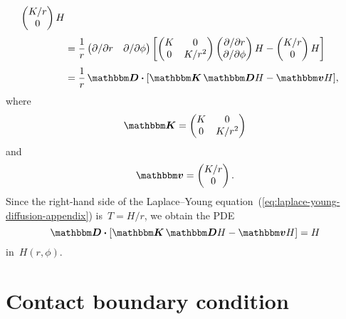 \begin{align*}
{\begin{pmatrix}
        K / r \\
        0
      \end{pmatrix}
      H
    }
    \\[\tallspace]
  &=
    \frac{1}{r}
    \begin{pmatrix}
      \pd / {\pd r} & \pd / {\pd\phi}
    \end{pmatrix}
    \squarebr*{
      \begin{pmatrix}
        K  &  0 \\
        0  &  K / r^2
      \end{pmatrix}
      \begin{pmatrix}
        \pd / {\pd r} \\
        \pd / {\pd\phi}
      \end{pmatrix}
      H
        -
      \begin{pmatrix}
        K / r \\
        0
      \end{pmatrix}
      H
    }
    \\[\tallspace]
  &=
    \frac{1}{r}
    \matder \dotp \squarebr[\bulkysize]{\mat{K} \matder H - \mat{v} H},
\end{align*}
where
\begin{equation}
  \mat{K} =
    \begin{pmatrix}
      K  &  0 \\
      0  &  K / r^2
    \end{pmatrix}
  \label{eq:small-formally-rectangular-diffusion-coefficient-singular}
\end{equation}
and
\begin{equation}
  \mat{v} =
    \begin{pmatrix}
      K / r \\
      0
    \end{pmatrix}.
    \label{eq:small-formally-rectangular-convection-coefficient-singular}
\end{equation}
Since the right-hand side
of the Laplace--Young equation~(\ref{eq:laplace-young-diffusion-appendix})
is~$T = H / r$,
we obtain the PDE
\begin{equation}
  \saveequation{
    \matder \dotp \squarebr[\bulkysize]{\mat{K} \matder H - \mat{v} H}
  }{=}{
    H
  }{eq:small-formally-rectangular-laplace-young-appendix}
\end{equation}
in~$H (r, \phi)$.

\section{Contact boundary condition}
\label{sec:extraction.boundary}


